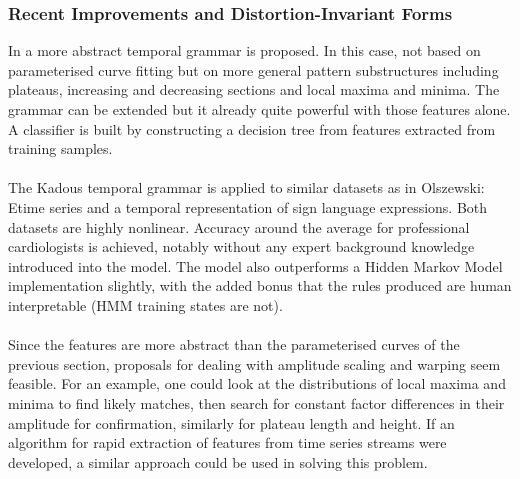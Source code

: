 	\subsubsection{Recent Improvements and Distortion-Invariant Forms}
	In \citep{kadous2005classification} a more abstract temporal grammar is proposed. In this case, not based on parameterised curve fitting but on more general pattern substructures including plateaus, increasing and decreasing sections and local maxima and minima. The grammar can be extended but it already quite powerful with those features alone. A classifier is built by constructing a decision tree from features extracted from training samples.
	\paragraph{}
	The Kadous temporal grammar is applied to similar datasets as in Olszewski: Etime series and a temporal representation of sign language expressions.  Both datasets are highly nonlinear. Accuracy around the average for professional cardiologists is achieved, notably without any expert background knowledge introduced into the model. The model also outperforms a Hidden Markov Model implementation slightly, with the added bonus that the rules produced are human interpretable (HMM training states are not). 
	\paragraph{}
	Since the features are more abstract than the parameterised curves of the previous section, proposals for dealing with amplitude scaling and warping seem feasible. For an example, one could look at the distributions of local maxima and minima to find likely matches, then search for constant factor differences in their amplitude for confirmation, similarly for plateau length and height. If an algorithm for rapid extraction of features from time series streams were developed, a similar approach could be used in solving this problem.
	
